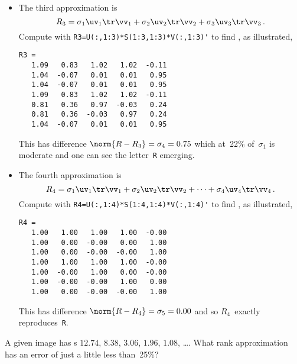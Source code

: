 \begin{example}
\begin{solution}
\begin{itemize}
\item The third approximation is 
\begin{equation*}
R_3=\sigma_1\uv_1\tr\vv_1 +\sigma_2\uv_2\tr\vv_2 +\sigma_3\uv_3\tr\vv_3\,.
\end{equation*}
Compute with \verb|R3=U(:,1:3)*S(1:3,1:3)*V(:,1:3)'| to find \twodp, as illustrated, 
\marginpar{}
\begin{verbatim}
R3 =
   1.09   0.83   1.02   1.02  -0.11
   1.04  -0.07   0.01   0.01   0.95
   1.04  -0.07   0.01   0.01   0.95
   1.09   0.83   1.02   1.02  -0.11
   0.81   0.36   0.97  -0.03   0.24
   0.81   0.36  -0.03   0.97   0.24
   1.04  -0.07   0.01   0.01   0.95
\end{verbatim}
This has difference \(\norm{R-R_3}=\sigma_4=0.75\) which at~22\% of~\(\sigma_1\) is moderate and one can see the letter~\verb|R| emerging.
 
\item The fourth approximation is 
\begin{equation*}
R_4=\sigma_1\uv_1\tr\vv_1+\sigma_2\uv_2\tr\vv_2+\cdots+\sigma_4\uv_4\tr\vv_4\,.
\end{equation*}
Compute with \verb|R4=U(:,1:4)*S(1:4,1:4)*V(:,1:4)'| to find \twodp, as illustrated, 
\marginpar{}
\begin{verbatim}
R4 =
   1.00   1.00   1.00   1.00  -0.00
   1.00   0.00  -0.00   0.00   1.00
   1.00   0.00  -0.00  -0.00   1.00
   1.00   1.00   1.00   1.00  -0.00
   1.00  -0.00   1.00   0.00  -0.00
   1.00  -0.00  -0.00   1.00   0.00
   1.00   0.00  -0.00  -0.00   1.00
\end{verbatim}
This has difference \(\norm{R-R_4}=\sigma_5=0.00\) and so \(R_4\)~exactly reproduces~\verb|R|.
 
\end{itemize}
\end{solution}
\end{example}




\begin{activity}
A given image has s \(12.74\), \(8.38\), \(3.06\), \(1.96\), \(1.08\), \ldots. 
What rank approximation has an error of just a little less than~25\%?
\end{activity}





